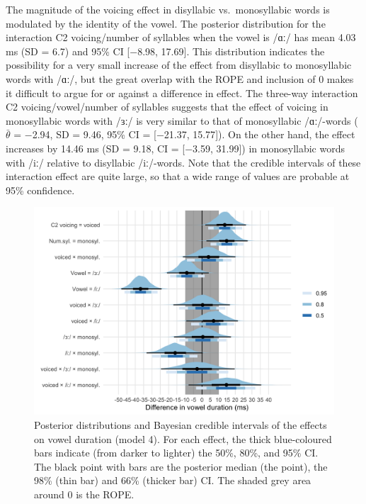\documentclass[12pt,a4paper,]{article}
\begin{document}
The magnitude of the voicing effect in disyllabic vs.~monosyllabic words
is modulated by the identity of the vowel. The posterior distribution
for the interaction C2 voicing/number of syllables when the vowel is
/ɑː/ has mean 4.03 ms (SD = 6.7) and 95\% CI {[}−8.98, 17.69{]}. This
distribution indicates the possibility for a very small increase of the
effect from disyllabic to monosyllabic words with /ɑː/, but the great
overlap with the ROPE and inclusion of 0 makes it difficult to argue for
or against a difference in effect. The three-way interaction C2
voicing/vowel/number of syllables suggests that the effect of voicing in
monosyllabic words with /ɜː/ is very similar to that of monosyllabic
/ɑː/-words (\(\bar{\theta}\) = −2.94, SD = 9.46, 95\% CI = {[}−21.37,
15.77{]}). On the other hand, the effect increases by 14.46 ms (SD =
9.18, CI = {[}−3.59, 31.99{]}) in monosyllabic words with /iː/ relative
to disyllabic /iː/-words. Note that the credible intervals of these
interaction effect are quite large, so that a wide range of values are
probable at 95\% confidence.

\begin{figure}
\includegraphics[width=\linewidth]{2019-english-rr_files/figure-latex/Figure2-1} \caption{Posterior distributions and Bayesian credible intervals of the effects on vowel duration (model 4). For each effect, the thick blue-coloured bars indicate (from darker to lighter) the 50\%, 80\%, and 95\% CI. The black point with bars are the posterior median (the point), the 98\% (thin bar) and 66\% (thicker bar) CI. The shaded grey area around 0 is the ROPE.}\label{f:Figure2}
\end{figure}
\end{document}

